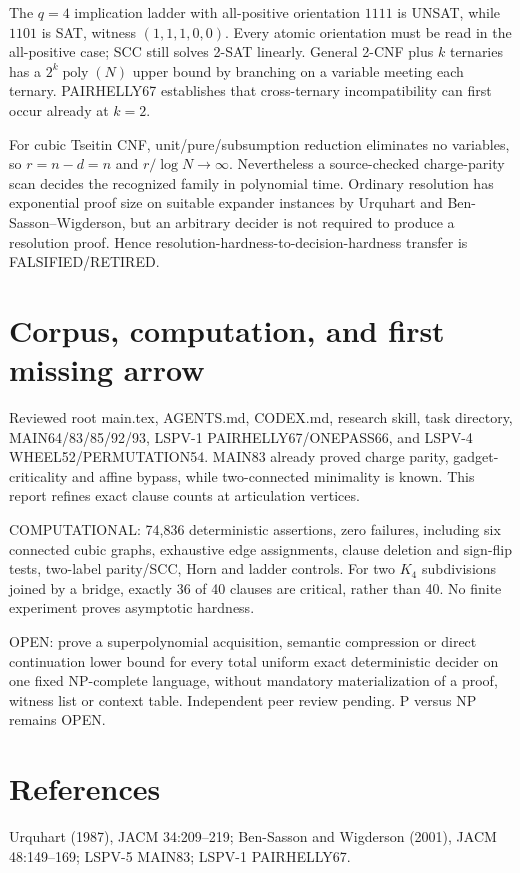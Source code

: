 \documentclass{article}
\begin{document}
The $q=4$ implication ladder with all-positive orientation $1111$ is UNSAT, while $1101$ is SAT, witness $(1,1,1,0,0)$. Every atomic orientation must be read in the all-positive case; SCC still solves 2-SAT linearly. General 2-CNF plus $k$ ternaries has a $2^k\operatorname{poly}(N)$ upper bound by branching on a variable meeting each ternary. PAIRHELLY67 establishes that cross-ternary incompatibility can first occur already at $k=2$.

For cubic Tseitin CNF, unit/pure/subsumption reduction eliminates no variables, so $r=n-d=n$ and $r/\log N\to\infty$. Nevertheless a source-checked charge-parity scan decides the recognized family in polynomial time. Ordinary resolution has exponential proof size on suitable expander instances by Urquhart and Ben-Sasson--Wigderson, but an arbitrary decider is not required to produce a resolution proof. Hence resolution-hardness-to-decision-hardness transfer is FALSIFIED/RETIRED.
\section{Corpus, computation, and first missing arrow}
Reviewed root main.tex, AGENTS.md, CODEX.md, research skill, task directory, MAIN64/83/85/92/93, LSPV-1 PAIRHELLY67/ONEPASS66, and LSPV-4 WHEEL52/PERMUTATION54. MAIN83 already proved charge parity, gadget-criticality and affine bypass, while two-connected minimality is known. This report refines exact clause counts at articulation vertices.

COMPUTATIONAL: 74,836 deterministic assertions, zero failures, including six connected cubic graphs, exhaustive edge assignments, clause deletion and sign-flip tests, two-label parity/SCC, Horn and ladder controls. For two $K_4$ subdivisions joined by a bridge, exactly 36 of 40 clauses are critical, rather than 40. No finite experiment proves asymptotic hardness.

OPEN: prove a superpolynomial acquisition, semantic compression or direct continuation lower bound for every total uniform exact deterministic decider on one fixed NP-complete language, without mandatory materialization of a proof, witness list or context table. Independent peer review pending. P versus NP remains OPEN.
\section{References}
Urquhart (1987), JACM 34:209--219; Ben-Sasson and Wigderson (2001), JACM 48:149--169; LSPV-5 MAIN83; LSPV-1 PAIRHELLY67.
\end{document}
